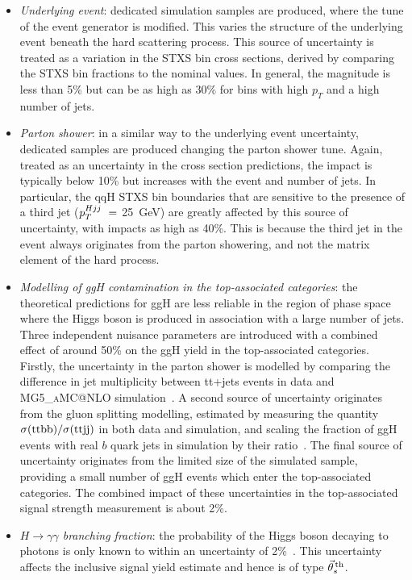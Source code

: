 \begin{itemize}
    \item \textit{Underlying event}: dedicated simulation samples are produced, where the tune of the event generator is modified. This varies the structure of the underlying event beneath the hard scattering process. This source of uncertainty is treated as a variation in the STXS bin cross sections, derived by comparing the STXS bin fractions to the nominal values. In general, the magnitude is less than 5\% but can be as high as 30\% for bins with high $p_T$ and a high number of jets.
    
    \item \textit{Parton shower}: in a similar way to the underlying event uncertainty, dedicated samples are produced changing the parton shower tune. Again, treated as an uncertainty in the cross section predictions, the impact is typically below 10\% but increases with the event \pt and number of jets. In particular, the qqH STXS bin boundaries that are sensitive to the presence of a third jet ($p_T^{Hjj}~=~$25~GeV) are greatly affected by this source of uncertainty, with impacts as high as 40\%. This is because the third jet in the event always originates from the parton showering, and not the matrix element of the hard process.
    
    \item \textit{Modelling of ggH contamination in the top-associated categories}: the theoretical predictions for ggH are less reliable in the region of phase space where the Higgs boson is produced in association with a large number of jets. Three independent nuisance parameters are introduced with a combined effect of around 50\% on the ggH yield in the top-associated categories. Firstly, the uncertainty in the parton shower is modelled by comparing the difference in jet multiplicity between tt+jets events in data and \textsc{MG5\_aMC@NLO} simulation~\cite{Sirunyan:2018ucr}. A second source of uncertainty originates from the gluon splitting modelling, estimated by measuring the quantity $\sigma({\rm{ttbb}})/\sigma({\rm{ttjj}})$ in both data and simulation, and scaling the fraction of ggH events with real $b$ quark jets in simulation by their ratio~\cite{CMS-PAS-TOP-16-010}. The final source of uncertainty originates from the limited size of the simulated sample, providing a small number of ggH events which enter the top-associated categories. The combined impact of these uncertainties in the top-associated signal strength measurement is about 2\%.
    
    \item \textit{$H\rightarrow\gamma\gamma$ branching fraction}: the probability of the Higgs boson decaying to photons is only known to within an uncertainty of 2\%~\cite{deFlorian:2016spz}. This uncertainty affects the inclusive signal yield estimate and hence is of type $\vec{\theta}^{\,\rm{th}}_{s}$.
\end{itemize}

